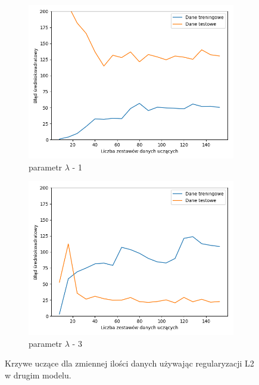 \documentclass[12pt]{aghdpl}
\begin{document}
\begin{figure}[h]
		 	\begin{subfigure}{.5\linewidth}
		 		\includegraphics[width =\linewidth]{wykresy/6_regularyzacja/l2/regularyzacja_1_learning_curves.png}
		 		\caption{parametr $\lambda$ - 1}
		 	\end{subfigure}
		 	\begin{subfigure}{.5\linewidth}
		 		\includegraphics[width =\linewidth]{wykresy/6_regularyzacja/l2/regularyzacja_3_learning_curves.png}
		 		\caption{parametr $\lambda$ - 3}
		 	\end{subfigure}
	 	
 			\caption{Krzywe uczące dla zmiennej ilości danych używając regularyzacji L2 w drugim modelu.}
			\label{fig: drugi_model_przy_regularyzacji_l2_learning_curves}
		\end{figure}
		
		\printbibliography
\end{document}
